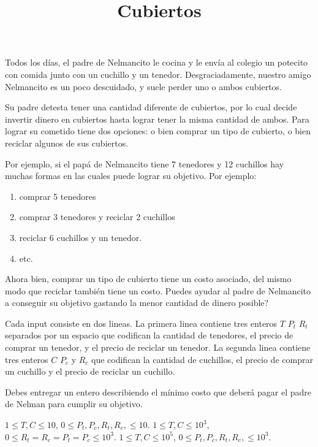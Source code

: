 \documentclass{oci}
\title{Cubiertos}
\begin{document}
\begin{problemDescription}
Todos los días, el padre de Nelmancito le cocina y le envía al colegio un potecito con comida junto con un cuchillo y un tenedor. Desgraciadamente, nuestro amigo Nelmancito es un poco descuidado, y suele perder uno o ambos cubiertos.

Su padre detesta tener una cantidad diferente de cubiertos, por lo cual decide invertir dinero en cubiertos hasta lograr tener la misma cantidad de ambos. Para lograr su cometido tiene dos opciones: o bien comprar un tipo de cubierto, o bien reciclar algunos de sus cubiertos.

Por ejemplo, si el papá de Nelmancito tiene 7 tenedores y 12 cuchillos hay muchas formas en las cuales puede lograr su objetivo. Por ejemplo: 

\begin{enumerate}
	\item comprar 5 tenedores
	\item comprar 3 tenedores y reciclar 2 cuchillos
	\item reciclar 6 cuchillos y un tenedor.
	\item etc.
\end{enumerate}

Ahora bien, comprar un tipo de cubierto tiene un costo asociado, del mismo modo que reciclar también tiene un costo. Puedes ayudar al padre de Nelmancito a conseguir su objetivo gastando la menor cantidad de dinero posible?


\end{problemDescription}

\begin{inputDescription}
Cada input consiste en dos lineas. La primera linea contiene tres enteros $T$ $P_t$ $R_t$ separados por un espacio que codifican la cantidad de tenedores, el precio de comprar un tenedor, y el precio de reciclar un tenedor. La segunda linea contiene tres enteros $C$ $P_c$ y $R_c$ que codifican la cantidad de cuchillos, el precio de comprar un cuchillo y el precio de reciclar un cuchillo.
\end{inputDescription}

\begin{outputDescription}
Debes entregar un entero describiendo el mínimo costo que deberá pagar el padre de Nelman para cumplir su objetivo.
\end{outputDescription}

\begin{scoreDescription}
   $1 \leq T,C \leq 10$, $ 0 \leq P_t, P_c, R_t, R_c, \leq 10$.
   $1 \leq T,C \leq 10^3$, $ 0 \leq R_t= R_c = P_t = P_c \leq 10^3$.
   $1 \leq T,C \leq 10^5$, $ 0 \leq P_t, P_c, R_t, R_c, \leq 10^3$.
\end{scoreDescription}

\begin{sampleDescription}
\end{sampleDescription}
\end{document}
